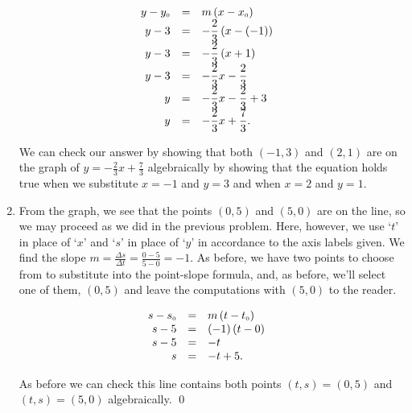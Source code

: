 \documentclass{ximera}
\begin{document}
\begin{ex}
\begin{enumerate}
\vspace{-.1in}

\setlength{\extrarowheight}{10pt}
\[\begin{array}{rclr} 
y - y_{\mbox{\tiny$0$}} & = & m\left(x - x_{\mbox{\tiny$0$}}\right)  & \\
y - 3 & = & -\dfrac{2}{3} \left(x - (-1)\right) & \\
y - 3 & = & -\dfrac{2}{3} \left(x +1 \right) & \\
y - 3& = & -\dfrac{2}{3}x - \dfrac{2}{3}\\
y& = & -\dfrac{2}{3}x - \dfrac{2}{3} + 3\\
y & = & -\dfrac{2}{3} x + \dfrac{7}{3}. \\ 
\end{array} \]

\setlength{\extrarowheight}{2pt}

We can check our answer by showing that both $(-1,3)$ and $(2,1)$ are on the graph of $y  =  -\frac{2}{3} x + \frac{7}{3}$ algebraically by showing that the equation holds true when we substitute $x = -1$ and $y=3$ and when $x = 2$ and $y = 1$.

\item  From the graph, we see that the points $(0,5)$ and $(5,0)$ are on the line, so we may proceed as we did in the previous problem.  Here, however,  we use `$t$' in place of `$x$' and `$s$' in place of `$y$' in accordance to the axis labels given.  We find the slope $m = \frac{\Delta s}{\Delta t} = \frac{0 - 5}{5 - 0} = -1$.  As before, we have two points to choose from to substitute into the point-slope formula, and, as before, we'll select one of them, $(0,5)$ and leave the computations with $(5,0)$ to the reader.  

\[\begin{array}{rclr} 
s - s_{\mbox{\tiny$0$}} & = & m\left(t - t_{\mbox{\tiny$0$}}\right)  & \\
s - 5 & = & (-1) \left(t -0 \right) & \\
s- 5 & = &-t & \\
s& = & -t + 5.\\
\end{array} \]

\enlargethispage{.1in}

As before we can check this line contains both points $(t,s) = (0,5)$ and $(t,s) = (5,0)$ algebraically.  \qed

\end{enumerate}

\end{ex}
\end{document}
